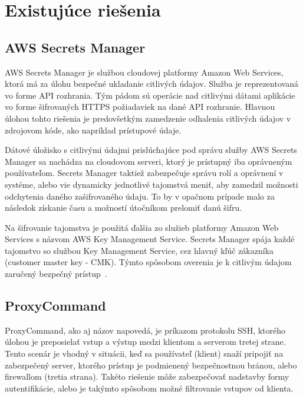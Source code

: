 \section{Existujúce riešenia}\label{sec:existujuce-riesenia}

\subsection{AWS Secrets Manager}\label{subsec:aws-secrets-manager}

AWS Secrets Manager je službou cloudovej platformy Amazon Web Services, ktorá má za úlohu bezpečné ukladanie citlivých údajov.
Služba je reprezentovaná vo forme API rozhrania.
Tým pádom sú operácie nad citlivými dátami aplikácie vo forme šifrovaných HTTPS požiadaviek na dané API rozhranie.
Hlavnou úlohou tohto riešenia je predovšetkým zamedzenie odhalenia citlivých údajov v zdrojovom kóde, ako napríklad prístupové údaje.

Dátové úložisko s citlivými údajmi prislúchajúce pod správu služby AWS Secrets Manager sa nachádza na cloudovom serveri, ktorý
je prístupný iba oprávneným používateľom.
Secrets Manager taktiež zabezpečuje správu rolí a oprávnení v systéme, alebo vie dynamicky jednotlivé tajomstvá meniť, aby
zamedzil možnosti odchytenia daného zašifrovaného údaju.
To by v opačnom prípade malo za následok získanie času a možností útočníkom prelomiť danú šifru.

Na šifrovanie tajomstva je použitá ďalšia zo služieb platformy Amazon Web Services s názvom AWS Key Management Service.
Secrets Manager spája každé tajomstvo so službou Key Management Service, cez hlavný kľúč zákazníka (customer master key - CMK).
Týmto spôsobom overenia je k citlivým údajom zaručený bezpečný prístup~\cite{SecretsManager}.

\subsection{ProxyCommand}\label{subsec:proxy-command}

ProxyCommand, ako aj názov napovedá, je príkazom protokolu SSH, ktorého úlohou je preposielať vstup a výstup medzi klientom
a serverom tretej strane.
Tento scenár je vhodný v situácii, keď sa používateľ (klient) snaží pripojiť na zabezpečený server, ktorého
prístup je podmienený bezpečnostnou bránou, alebo firewallom (tretia strana).
Takéto riešenie môže zabezpečovať nadstavby formy autentifikácie, alebo je takýmto spôsobom možné filtrovanie vstupov od klienta.

